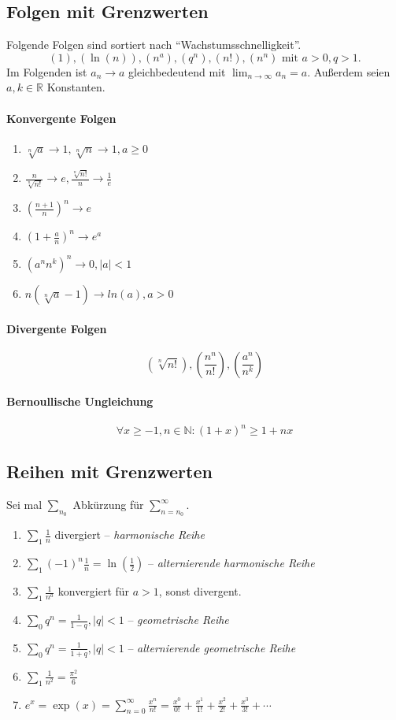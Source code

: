 \documentclass[a4paper, 9pt, DIV=24]{scrartcl}
\newcommand{\N}{\mathbb{N}}
\begin{document}
\subsection{Folgen mit Grenzwerten}
Folgende Folgen sind sortiert nach ``Wachstumsschnelligkeit''.
\[ (1), (\ln(n)), (n^{a}), (q^n), (n!), (n^n) \text{ mit } a > 0, q > 1.\]
Im Folgenden ist $a_n \rightarrow a$ gleichbedeutend mit $\lim_{n\rightarrow\infty} a_n = a$.
Außerdem seien $a,k\in\mathbb{R}$ Konstanten.
\paragraph{Konvergente Folgen}
\begin{enumerate}[label={(}\arabic*{)}]
 \item $\sqrt[n]{a} \rightarrow 1, \sqrt[n]{n} \rightarrow 1, a \geq 0$
 \item $\frac{n}{\sqrt[n]{n!}} \rightarrow e, \frac{\sqrt[n]{n!}}{n} \rightarrow \frac{1}{e}$
 \item $(\frac{n+1}{n})^n \rightarrow e$
 \item $(1 + \frac{a}{n})^n \rightarrow e^a$
 \item $(a^nn^k)^n \rightarrow 0, |a| < 1$
 \item $n(\sqrt[n]{a}-1) \rightarrow ln(a), a > 0$
\end{enumerate}
\paragraph{Divergente Folgen}
\[ (\sqrt[n]{n!}), (\frac{n^n}{n!}), (\frac{a^n}{n^k}) \]
\paragraph{Bernoullische Ungleichung}
\[ \forall x\geq -1, n\in\N: (1+x)^n \geq 1 + nx \]

\subsection{Reihen mit Grenzwerten}
Sei mal $\sum_{n_0}$ Abkürzung für $\sum_{n=n_0}^\infty$.
\begin{enumerate}[label={(}\arabic*{)}]
 \item $\sum_1 \frac{1}{n}$ divergiert -- \emph{harmonische Reihe}
 \item $\sum_1 (-1)^n\frac{1}{n} = \ln(\frac{1}{2})$ -- \emph{alternierende harmonische Reihe}
 \item $\sum_1 \frac{1}{n^a}$ konvergiert für $a > 1$, sonst divergent.
 \item $\sum_0 q^n = \frac{1}{1-q}, |q| < 1$ -- \emph{geometrische Reihe}
 \item $\sum_0 q^n = \frac{1}{1+q}, |q| < 1$ -- \emph{alternierende geometrische Reihe}
 \item $\sum_1 \frac{1}{n^2} = \frac{\pi^2}{6}$
 \item $ e^x = \exp(x) = \sum_{n=0}^\infty \frac{x^n}{n!} = \frac{x^0}{0!} + \frac{x^1}{1!} + \frac{x^2}{2!} + \frac{x^3}{3!} + \cdots $
\end{enumerate}
\end{document}
